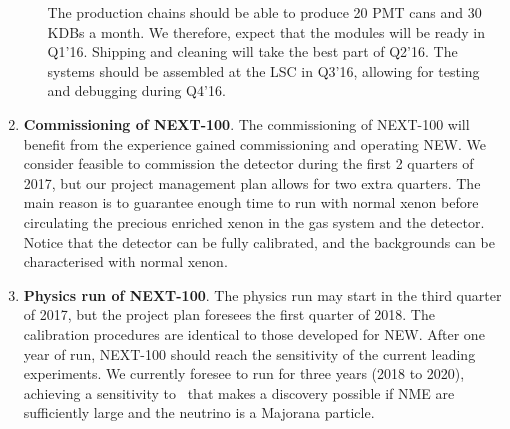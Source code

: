 \begin{enumerate}
\begin{enumerate}
The production chains should be able to produce 20 PMT cans and 30 KDBs a month. We therefore, expect that the modules will be ready in Q1'16. Shipping and cleaning will take the best part of Q2'16. The systems should be assembled at the LSC in Q3'16, allowing for testing and debugging during Q4'16.
\end{enumerate}

\item {\bf Commissioning of NEXT-100}. The commissioning of NEXT-100 will benefit from the experience gained commissioning and operating NEW. We consider feasible to commission the detector during the first 2 quarters of 2017, but our project management plan allows for two extra quarters. The main reason is to guarantee enough time to run with normal xenon before circulating the precious enriched xenon in the gas system and the detector. Notice that the detector can be fully calibrated, and the backgrounds can be characterised with normal xenon.  

\item {\bf Physics run of NEXT-100}. The physics run may start in the third quarter of 2017, but the project plan foresees the first quarter of 2018. The calibration procedures are identical to those developed for NEW. After one year of run, NEXT-100 should reach the sensitivity of the current leading experiments. We currently foresee to run for three years (2018 to 2020), achieving a sensitivity to \mbb\ that makes a discovery possible if NME are sufficiently large and the neutrino is a Majorana particle. 

\end{enumerate}
